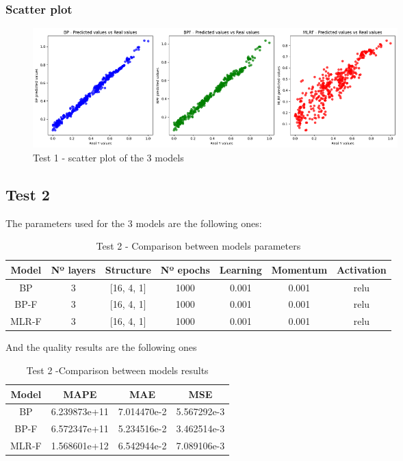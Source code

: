 \documentclass[11pt, a4paper]{article}
\begin{document}
\subsubsection{Scatter plot}

\begin{figure}[H]
    \centering
    \includegraphics[width=400pt]{images/test1_scatter.png}
    \caption{Test 1 - scatter plot of the 3 models}
    \label{fig:image_scatter_comparison_1}
\end{figure}

\subsection{Test 2}

The parameters used for the 3 models are the following ones:

\begin{table}[H]
    \centering
    \begin{tabular}{|c|c|c|c|c|c|c|}
        \hline
        \textbf{Model} & \textbf{Nº layers} & \textbf{Structure}  & \textbf{Nº epochs} & \textbf{Learning} & \textbf{Momentum} & \textbf{Activation} \\ \hline
        BP       & 3                & [16, 4, 1]    & 1000      & 0.001         & 0.001    & relu                \\ \hline
        BP-F     & 3                & [16, 4, 1]    & 1000      & 0.001         & 0.001    & relu                \\ \hline
        MLR-F    & 3                & [16, 4, 1]    & 1000      & 0.001         & 0.001    & relu              \\ \hline
    \end{tabular}
    \caption{Test 2 - Comparison between models parameters}
    \label{tab:table_parameters_comparison_2}
\end{table}

And the quality results are the following ones

\begin{table}[H]
    \centering
    \begin{tabular}{|c|c|c|c|}
        \hline
        \textbf{Model} & \textbf{MAPE}         & \textbf{MAE}         & \textbf{MSE}         \\ \hline
        BP & 6.239873e+11 & 7.014470e-2 & 5.567292e-3 \\ \hline
        BP-F & 6.572347e+11 & 5.234516e-2 & 3.462514e-3 \\ \hline
        MLR-F & 1.568601e+12 & 6.542944e-2 & 7.089106e-3 \\ \hline
    \end{tabular}
    \caption{Test 2 -Comparison between models results}
    \label{tab:table_results_comparison_2}
\end{table}
\end{document}

